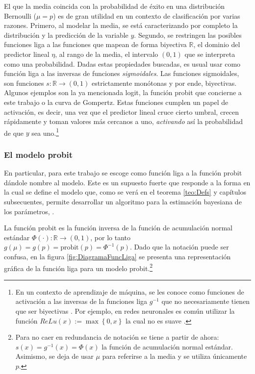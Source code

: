 \documentclass[../Main/Main.tex]{subfiles}
\begin{document}
El que la media coincida con la probabilidad de éxito en una distribución Bernoulli ($\mu = p$) es de gran utilidad en un contexto de clasificación por varias razones. Primero, al modelar la media, se está caracterizando por completo la distribución y la predicción de la variable $y$. Segundo, se restringen las posibles funciones liga a las funciones que mapean de forma biyectiva $\mathbb{R}$, el dominio del predictor lineal $\eta$, al rango de la media, el intervalo $(0,1)$ que se interpreta como una probabilidad. Dadas estas propiedades buscadas, es usual usar como función liga a las inversas de funciones \textit{sigmoidales}. Las funciones sigmoidales, son funciones  $s:\mathbb{R}\rightarrow (0,1)$ estrictamente monótonas y por ende, biyectivas. Algunos ejemplos son la ya mencionada logit, la función probit que concierne a este trabajo o la curva de Gompertz. Estas funciones cumplen un papel de activación, es decir, una vez que el predictor lineal cruce cierto umbral, crecen rápidamente y toman valores más cercanos a uno, \textit{activando} así la probabilidad de que $y$ sea uno.\footnote{En un contexto de aprendizaje de máquina, se les conoce como funciones de activación a las inversas de la funciones liga $g^{-1}$ que no necesariamente tienen que ser biyectivas \autocite{bishop2006pattern}. Por ejemplo, en redes neuronales es común utilizar la función $\textit{ReLu}(x):= \max\left\{0,x\right\}$ la cual no es suave \autocite{3blue1brown2017}.}

\subsubsection*{El modelo probit}
En particular, para este trabajo se escoge como función liga a la función probit dándole nombre al modelo. Este es un supuesto fuerte que responde a la forma en la cual se define el modelo que, como se verá en el teorema \ref{teo:Defs} y capítulos subsecuentes, permite desarrollar un algoritmo para la estimación bayesiana de los parámetros, \citet{albert1993bayesian}. 

La función probit es la función inversa de la función de acumulación normal estándar $\Phi(\cdot):\mathbb{R}\rightarrow(0,1)$, por lo tanto $g(\mu) = g(p) = \text{probit}(p) = \Phi^{-1}(p)$. Dado que la notación puede ser confusa, en la figura \ref{fig:DiagramaFuncLiga} se presenta una representación gráfica de la función liga para un modelo probit.\footnote{Para no caer en redundancia de notación se tiene a partir de ahora: $s(x) = g^{-1}(x) = \Phi(x)$ la función de acumulación normal estándar. Asimismo, se deja de usar $\mu$ para referirse a la media y se utiliza únicamente $p$.}
\end{document}
